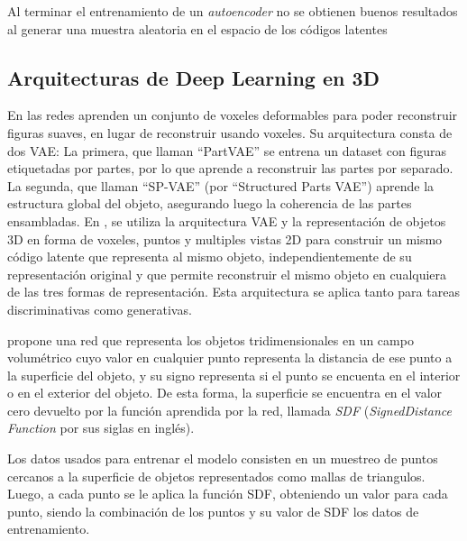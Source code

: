 \documentclass[spanish]{article}
\begin{document}
Al terminar el entrenamiento de un \textit{autoencoder} no se obtienen
buenos resultados al generar una muestra aleatoria en el espacio de
los códigos latentes

\subsection{Arquitecturas de Deep Learning en 3D}

En \cite{Gao2019} las redes aprenden un conjunto de voxeles deformables
para poder reconstruir figuras suaves, en lugar de reconstruir usando
voxeles. Su arquitectura consta de dos VAE: La primera, que llaman
``PartVAE'' se entrena un dataset con figuras etiquetadas por partes,
por lo que aprende a reconstruir las partes por separado. La segunda,
que llaman ``SP-VAE'' (por ``Structured Parts VAE'') aprende la
estructura global del objeto, asegurando luego la coherencia de las
partes ensambladas. En \cite{Muralikrishnan2019}, se utiliza la
arquitectura VAE y la representación de objetos 3D en forma de voxeles,
puntos y multiples vistas 2D para construir un mismo código latente
que representa al mismo objeto, independientemente de su
representación original y que permite reconstruir el mismo objeto en
cualquiera de las tres formas de representación. Esta arquitectura se
aplica tanto para tareas discriminativas como generativas.

\cite{Park2019} propone una red que representa los objetos tridimensionales
en un campo volumétrico cuyo valor en cualquier punto representa la 
distancia de ese punto a la superficie del objeto, y su signo representa si
el punto se encuenta en el interior o en el exterior del objeto. De esta
forma, la superficie se encuentra en el valor cero devuelto por la función
aprendida por la red, llamada \textit{SDF} (\textit{SignedDistance
Function} por sus siglas en inglés).

Los datos usados para entrenar el modelo consisten en un muestreo de puntos
cercanos a la superficie de objetos representados como mallas de triangulos.
Luego, a cada punto se le aplica la función SDF, obteniendo un valor para
cada punto, siendo la combinación de los puntos y su valor de SDF los datos
de entrenamiento.
\end{document}
